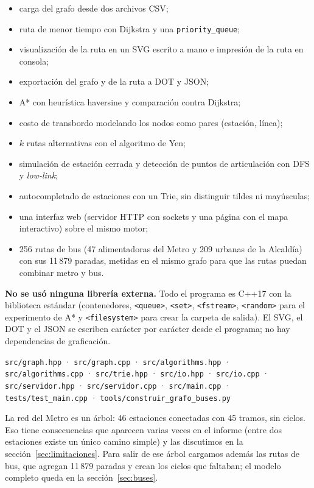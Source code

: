 \documentclass[11pt,a4paper]{article}
\newcommand{\arch}[1]{\texttt{#1}}
\begin{document}
\begin{itemize}
  \item carga del grafo desde dos archivos CSV;
  \item ruta de menor tiempo con Dijkstra y una \arch{priority\_queue};
  \item visualización de la ruta en un SVG escrito a mano e impresión de la ruta
        en consola;
  \item exportación del grafo y de la ruta a DOT y JSON;
  \item A* con heurística haversine y comparación contra Dijkstra;
  \item costo de transbordo modelando los nodos como pares (estación, línea);
  \item $k$ rutas alternativas con el algoritmo de Yen;
  \item simulación de estación cerrada y detección de puntos de articulación con
        DFS y \emph{low-link};
  \item autocompletado de estaciones con un Trie, sin distinguir tildes ni
        mayúsculas;
  \item una interfaz web (servidor HTTP con sockets y una página con el mapa
        interactivo) sobre el mismo motor;
  \item 256 rutas de bus (47 alimentadoras del Metro y 209 urbanas de la
        Alcaldía) con sus 11\,879 paradas, metidas en el mismo grafo para que las
        rutas puedan combinar metro y bus.
\end{itemize}

\textbf{No se usó ninguna librería externa.} Todo el programa es C++17 con la
biblioteca estándar (contenedores, \arch{<queue>}, \arch{<set>}, \arch{<fstream>},
\arch{<random>} para el experimento de A* y \arch{<filesystem>} para crear la
carpeta de salida). El SVG, el DOT y el JSON se escriben carácter por carácter
desde el programa; no hay dependencias de graficación.

\begin{center}
\arch{src/graph.hpp} · \arch{src/graph.cpp} · \arch{src/algorithms.hpp} ·
\arch{src/algorithms.cpp} · \arch{src/trie.hpp} · \arch{src/io.hpp} ·
\arch{src/io.cpp} · \arch{src/servidor.hpp} · \arch{src/servidor.cpp} ·
\arch{src/main.cpp} · \arch{tests/test\_main.cpp} ·
\arch{tools/construir\_grafo\_buses.py}
\end{center}

La red del Metro es un árbol: 46 estaciones conectadas con 45 tramos, sin
ciclos. Eso tiene consecuencias que aparecen varias veces en el informe (entre
dos estaciones existe un único camino simple) y las discutimos en la
sección~\ref{sec:limitaciones}. Para salir de ese árbol cargamos además las
rutas de bus, que agregan 11\,879 paradas y crean los ciclos que faltaban; el
modelo completo queda en la sección~\ref{sec:buses}.
\end{document}
